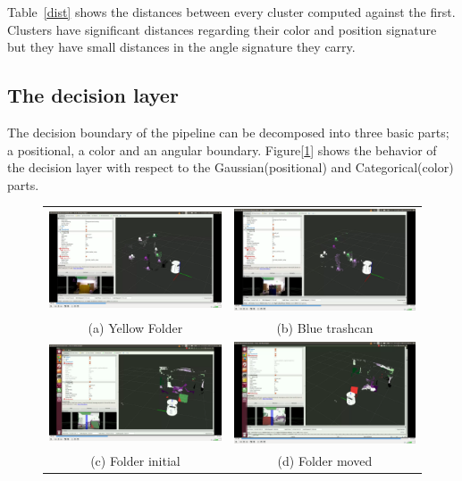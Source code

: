 \documentclass[]{article}
\begin{document}
    Table~\ref{dist} shows the distances between every cluster computed against the first. Clusters have significant distances regarding their color and position signature but they have small distances in the angle signature they carry.

    \subsection{The decision layer}

    The decision boundary of the pipeline can be decomposed into three basic parts; a positional, a color and an angular boundary. Figure[\ref{pip:bounds}] shows the behavior of the decision layer with respect to the Gaussian(positional) and Categorical(color) parts. 

    \begin{figure}
        \begin{tabular}{cc}
            \includegraphics[width=.3\textwidth]{colorBound} &   \includegraphics[width=.3\textwidth]{colorBound2} \\
            (a) Yellow Folder& (b) Blue trashcan \\[6pt]
            \includegraphics[width=.3\textwidth]{posBound} &   \includegraphics[width=.3\textwidth]{posBound2} \\
            (c) Folder initial  & (d) Folder moved \\[6pt]
        \end{tabular}
        \label{pip:bounds}
    \end{figure}
\end{document}
